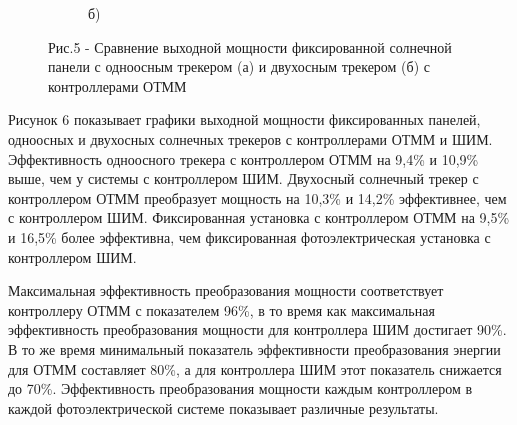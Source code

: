 \begin{figure}[H]
\begin{subfigure}[b]{0.45\textwidth}
        \caption*{б)}
    \end{subfigure}
    \caption*{Рис.5 - Сравнение выходной мощности фиксированной солнечной панели с одноосным трекером (а) и двухосным трекером (б) с контроллерами ОТММ}
\end{figure}

\begin{multicols}{2}
Рисунок 6 показывает графики выходной мощности фиксированных панелей,
одноосных и двухосных солнечных трекеров с контроллерами ОТММ и ШИМ.
Эффективность одноосного трекера с контроллером ОТММ на 9,4\% и 10,9\%
выше, чем у системы с контроллером ШИМ. Двухосный солнечный трекер с
контроллером ОТММ преобразует мощность на 10,3\% и 14,2\% эффективнее,
чем с контроллером ШИМ. Фиксированная установка с контроллером ОТММ на
9,5\% и 16,5\% более эффективна, чем фиксированная фотоэлектрическая
установка с контроллером ШИМ.

Максимальная эффективность преобразования мощности соответствует
контроллеру ОТММ с показателем 96\%, в то время как максимальная
эффективность преобразования мощности для контроллера ШИМ достигает
90\%. В то же время минимальный показатель эффективности преобразования
энергии для ОТММ составляет 80\%, а для контроллера ШИМ этот показатель
снижается до 70\%. Эффективность преобразования мощности каждым
контроллером в каждой фотоэлектрической системе показывает различные
результаты.
\end{multicols}

